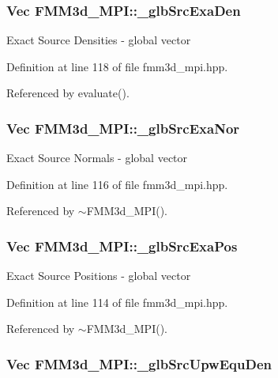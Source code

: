 \subsubsection{\setlength{\rightskip}{0pt plus 5cm}Vec {\bf FMM3d\_\-MPI::\_\-glb\-Src\-Exa\-Den}\hspace{0.3cm}{\tt  [protected]}}\label{classFMM3d__MPI_3bb661d28e0de9c4b15bde6dca01347f_3bb661d28e0de9c4b15bde6dca01347f}


Exact Source Densities - global vector 

Definition at line 118 of file fmm3d\_\-mpi.hpp.

Referenced by evaluate().
\subsubsection{\setlength{\rightskip}{0pt plus 5cm}Vec {\bf FMM3d\_\-MPI::\_\-glb\-Src\-Exa\-Nor}\hspace{0.3cm}{\tt  [protected]}}\label{classFMM3d__MPI_35e314d9587e65da5e2836770172711c_35e314d9587e65da5e2836770172711c}


Exact Source Normals - global vector 

Definition at line 116 of file fmm3d\_\-mpi.hpp.

Referenced by $\sim$FMM3d\_\-MPI().
\subsubsection{\setlength{\rightskip}{0pt plus 5cm}Vec {\bf FMM3d\_\-MPI::\_\-glb\-Src\-Exa\-Pos}\hspace{0.3cm}{\tt  [protected]}}\label{classFMM3d__MPI_bedc1c29cd7530dffd8d2b4f82047e46_bedc1c29cd7530dffd8d2b4f82047e46}


Exact Source Positions - global vector 

Definition at line 114 of file fmm3d\_\-mpi.hpp.

Referenced by $\sim$FMM3d\_\-MPI().
\subsubsection{\setlength{\rightskip}{0pt plus 5cm}Vec {\bf FMM3d\_\-MPI::\_\-glb\-Src\-Upw\-Equ\-Den}\hspace{0.3cm}{\tt  [protected]}}\label{classFMM3d__MPI_c85bfe5f10dd068ce5a35a0eea1ffb3c_c85bfe5f10dd068ce5a35a0eea1ffb3c}


